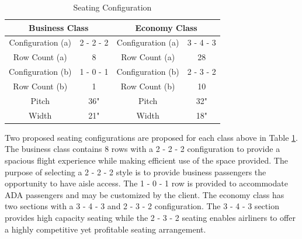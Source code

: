 \begin{table}[!h]
    \centering
    \caption{Seating Configuration}
    \begin{tabular}{|c|c||c|c|} \toprule
        \multicolumn{2}{c}{\textbf{Business Class}} & \multicolumn{2}{c}{\textbf{Economy Class}} \\ \hline
        Configuration (a) & 2 - 2 - 2 & Configuration (a) & 3 - 4 - 3 \\ \hline
        Row Count (a) & 8 & Row Count (a) & 28 \\ \hline
        Configuration (b) & 1 - 0 - 1 & Configuration (b) & 2 - 3 - 2 \\ \hline
        Row Count (b) & 1 & Row Count (b) & 10 \\ \hline
        Pitch & 36" & Pitch & 32" \\ \hline
        Width & 21" & Width & 18" \\ \bottomrule
    \end{tabular}
    \label{tab:seating}
\end{table}
 
Two proposed seating configurations are proposed for each class above in Table \ref{tab:seating}.  The business class contains 8 rows with a 2 - 2 - 2 configuration to provide a spacious flight experience while making efficient use of the space provided.  The purpose of selecting a 2 - 2 - 2 style is to provide business passengers the opportunity to have aisle access.  The 1 - 0 - 1 row is provided to accommodate ADA passengers and may be customized by the client.  The economy class has two sections with a 3 - 4 - 3 and 2 - 3 - 2 configuration.  The 3 - 4 - 3 section provides high capacity seating while the 2 - 3 - 2 seating enables airliners to offer a highly competitive yet profitable seating arrangement.







